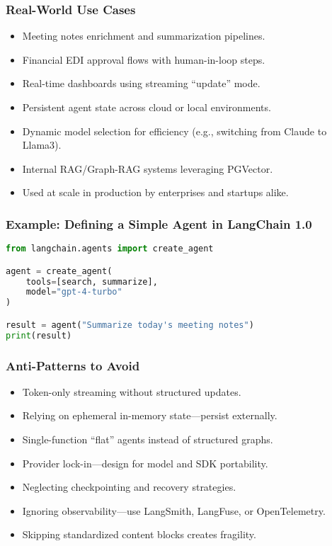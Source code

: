 \begin{frame}[fragile]\frametitle{Real-World Use Cases}
  \begin{itemize}
    \item Meeting notes enrichment and summarization pipelines.
    \item Financial EDI approval flows with human-in-loop steps.
    \item Real-time dashboards using streaming “update” mode.
    \item Persistent agent state across cloud or local environments.
    \item Dynamic model selection for efficiency (e.g., switching from Claude to Llama3).
    \item Internal RAG/Graph-RAG systems leveraging PGVector.
    \item Used at scale in production by enterprises and startups alike.
  \end{itemize}
\end{frame}

\begin{frame}[fragile]\frametitle{Example: Defining a Simple Agent in LangChain 1.0}
\begin{lstlisting}[language=Python]
from langchain.agents import create_agent

agent = create_agent(
    tools=[search, summarize],
    model="gpt-4-turbo"
)

result = agent("Summarize today's meeting notes")
print(result)
\end{lstlisting}
\end{frame}

\begin{frame}[fragile]\frametitle{Anti-Patterns to Avoid}
  \begin{itemize}
    \item Token-only streaming without structured updates.
    \item Relying on ephemeral in-memory state—persist externally.
    \item Single-function “flat” agents instead of structured graphs.
    \item Provider lock-in—design for model and SDK portability.
    \item Neglecting checkpointing and recovery strategies.
    \item Ignoring observability—use LangSmith, LangFuse, or OpenTelemetry.
    \item Skipping standardized content blocks creates fragility.
  \end{itemize}
\end{frame}

